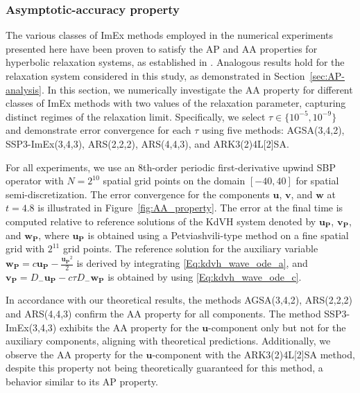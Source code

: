 \documentclass{article}
\begin{document}
\subsubsection{Asymptotic-accuracy property}
The various classes of ImEx methods employed in the numerical experiments presented here have been proven to satisfy the AP
and AA properties for hyperbolic relaxation systems, as established in \cite{pareschi2005implicit}. Analogous results hold
for the relaxation system considered in this study, as demonstrated in Section~\ref{sec:AP-analysis}. In this section, we numerically investigate
the AA property for different classes of ImEx methods with two values of the relaxation parameter, capturing distinct
regimes of the relaxation limit. Specifically, we select $\tau \in \{10^{-5}, 10^{-9}\}$ and demonstrate error convergence
for each $\tau$ using five methods: AGSA(3,4,2), SSP3-ImEx(3,4,3), ARS(2,2,2), ARS(4,4,3), and ARK3(2)4L[2]SA.

For all experiments, we use an 8th-order periodic first-derivative upwind SBP operator with $N = 2^{10}$ spatial grid
points on the domain $[-40, 40]$ for spatial semi-discretization. The error convergence for the components $\pmb{u}$, $\pmb{v}$,
and $\pmb{w}$ at $t = 4.8$ is illustrated in Figure~\ref{fig:AA_property}. The error at the final time is computed relative
to reference solutions of the KdVH system denoted by $\pmb{u_P}$, $\pmb{v_P}$, and $\pmb{w_P}$, where $\pmb{u_P}$ is obtained using a Petviashvili-type
method on a fine spatial grid with $2^{11}$ grid points. The reference solution for the auxiliary variable
$\pmb{w_P} = c \pmb{u_P} - \frac{\pmb{u_P}^2}{2}$ is derived by integrating \eqref{Eq:kdvh_wave_ode_a}, and $\pmb{v_P} = D_{-}\pmb{u_P} - c \tau D_{-} \pmb{w_P}$ is
obtained by using \eqref{Eq:kdvh_wave_ode_c}.


In accordance with our theoretical results, the methods AGSA(3,4,2), ARS(2,2,2) and ARS(4,4,3) confirm the AA property
for all components. The method SSP3-ImEx(3,4,3) exhibits the AA property for the $\pmb{u}$-component only but not for the auxiliary
components, aligning with theoretical predictions. Additionally, we observe the AA property for the $\pmb{u}$-component with
the ARK3(2)4L[2]SA method, despite this property not being theoretically guaranteed for this method, a behavior similar
to its AP property.
\end{document}
